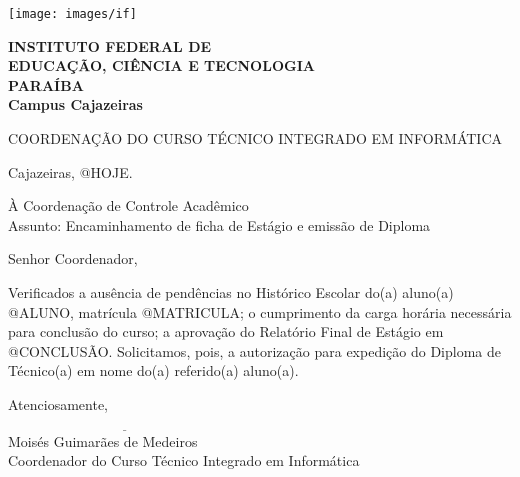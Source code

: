 \documentclass[a4paper, 12pt]{letter}
\begin{document}
\hspace{1.4cm}
\begin{minipage}{.19\textwidth}
    \texttt{[image: images/if]}
\end{minipage}
\begin{minipage}[t]{\textwidth}
        \vspace{.001cm}
        {\bf
            {\selectfont
                INSTITUTO FEDERAL DE\\
                EDUCAÇÃO, CIÊNCIA E TECNOLOGIA\\
                {\color{green}
                    PARAÍBA\\
                    Campus Cajazeiras
                }
            }
        }
\end{minipage}
{\bf
{\selectfont
    \begin{center}
        {\selectfont
            COORDENAÇÃO DO CURSO TÉCNICO INTEGRADO EM INFORMÁTICA
        }
    \end{center}
}

\begin{flushright}
Cajazeiras, @HOJE.
\end{flushright}

\noindent À Coordenação de Controle Acadêmico\\
Assunto: Encaminhamento de ficha de Estágio e emissão de Diploma

\noindent Senhor Coordenador,

\onehalfspacing Verificados a ausência de pendências no Histórico Escolar do(a) aluno(a)\linebreak
@ALUNO, matrícula @MATRICULA; o cumprimento da carga horária necessária para conclusão do curso; a aprovação do Relatório Final de Estágio  em @CONCLUSÃO. Solicitamos, pois, a autorização para expedição do Diploma de Técnico(a) em nome do(a) referido(a) aluno(a).

Atenciosamente,

\indent $\underline{\hspace{7cm}}$\\
\indent Moisés Guimarães de Medeiros\\
\indent Coordenador do Curso Técnico Integrado em Informática\\
}
\end{document}
